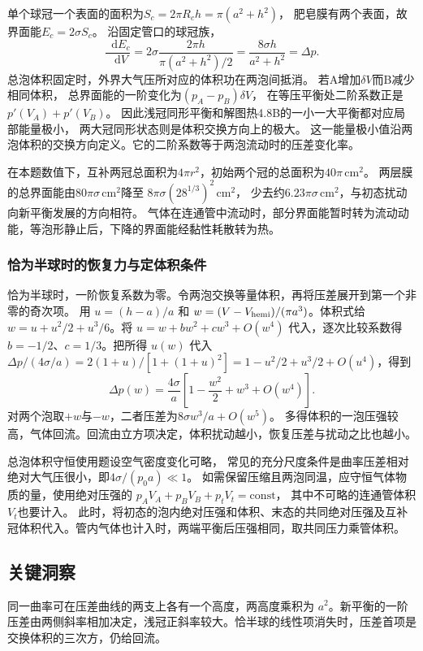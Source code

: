 \documentclass[UTF8,fontset=fandol,a4paper,11pt]{ctexart}
\newcommand{\dd}{\mathop{}\!\mathrm{d}}
\begin{document}
单个球冠一个表面的面积为$S_c=2\pi R_ch=\pi(a^2+h^2)$，
肥皂膜有两个表面，故界面能$E_c=2\sigma S_c$。
沿固定管口的球冠族，
\[
\frac{\dd E_c}{\dd V}
=2\sigma\frac{2\pi h}{\pi(a^2+h^2)/2}
=\frac{8\sigma h}{a^2+h^2}=\Delta p.
\]
总泡体积固定时，外界大气压所对应的体积功在两泡间抵消。
若A增加$\delta V$而B减少相同体积，
总界面能的一阶变化为$(p_A-p_B)\delta V$，
在等压平衡处二阶系数正是$p'(V_A)+p'(V_B)$。
因此浅冠同形平衡和解图热4.8B的一小一大平衡都对应局部能量极小，
两大冠同形状态则是体积交换方向上的极大。
这一能量极小值沿两泡体积的交换方向定义。它的二阶系数等于两泡流动时的压差变化率。

在本题数值下，互补两冠总面积为$4\pi r^2$，初始两个冠的总面积为$40\pi\,\mathrm{cm^2}$。
两层膜的总界面能由$80\pi\sigma\,\mathrm{cm^2}$降至
$8\pi\sigma(28^{1/3})^2\,\mathrm{cm^2}$，
少去约$6.23\pi\sigma\,\mathrm{cm^2}$，与初态扰动向新平衡发展的方向相符。
气体在连通管中流动时，部分界面能暂时转为流动动能，等泡形静止后，下降的界面能经黏性耗散转为热。

\subsubsection*{恰为半球时的恢复力与定体积条件}
恰为半球时，一阶恢复系数为零。令两泡交换等量体积，再将压差展开到第一个非零的奇次项。
用 $u=(h-a)/a$ 和 $w=(V-V_{\rm hemi})/(\pi a^3)$。体积式给 $w=u+u^2/2+u^3/6$。将 $u=w+bw^2+cw^3+O(w^4)$ 代入，逐次比较系数得 $b=-1/2$、$c=1/3$。把所得 $u(w)$ 代入 $\Delta p/(4\sigma/a)=2(1+u)/[1+(1+u)^2]=1-u^2/2+u^3/2+O(u^4)$，得到
\[
\Delta p(w)=\frac{4\sigma}{a}
\left[1-\frac{w^2}{2}+w^3+O(w^4)\right].
\]
对两个泡取$+w$与$-w$，二者压差为$8\sigma w^3/a+O(w^5)$。
多得体积的一泡压强较高，气体回流。回流由立方项决定，体积扰动越小，恢复压差与扰动之比也越小。

总泡体积守恒使用题设空气密度变化可略，
常见的充分尺度条件是曲率压差相对绝对大气压很小，即$4\sigma/(p_0a)\ll1$。
如需保留压缩且两泡同温，应守恒气体物质的量，使用绝对压强的
$p_AV_A+p_BV_B+p_tV_t=\mathrm{const}$，
其中不可略的连通管体积$V_t$也要计入。
此时，将初态的泡内绝对压强和体积、末态的共同绝对压强及互补冠体积代入。管内气体也计入时，两端平衡后压强相同，取共同压力乘管体积。




\subsection*{关键洞察}

同一曲率可在压差曲线的两支上各有一个高度，两高度乘积为 $a^2$。新平衡的一阶压差由两侧斜率相加决定，浅冠正斜率较大。恰半球的线性项消失时，压差首项是交换体积的三次方，仍给回流。
\end{document}
